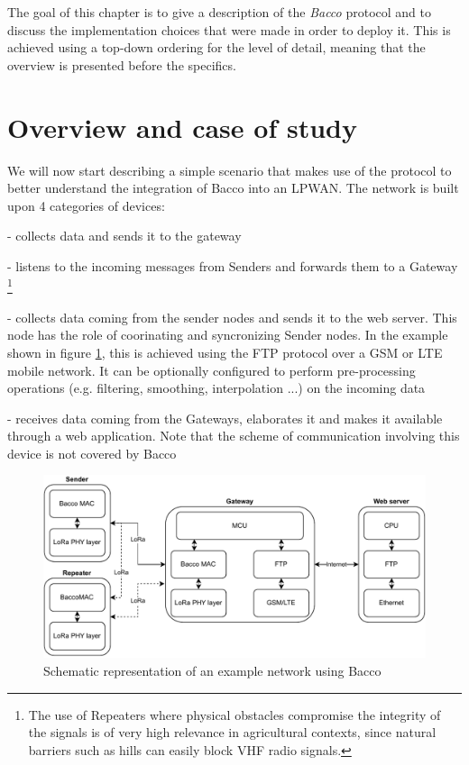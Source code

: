 The goal of this chapter is to give a description of the \textit{Bacco} protocol and to discuss the
implementation choices that were made in order to deploy it. This is achieved using a top-down ordering for the level
of detail, meaning that the overview is presented before the specifics.

\section{Overview and case of study}
We will now start describing a simple scenario that makes use of the protocol to better understand the integration of
Bacco into an LPWAN. The network is built upon 4 categories of devices:

\begin{description}[font=$\bullet$~\normalfont\scshape\color{blue!50!black}]
    \item [Sender node] - collects data and sends it to the gateway
    \item [Repeater node] - listens to the incoming messages from Senders and forwards them to a Gateway \footnote{The
        use of Repeaters where physical obstacles compromise the integrity of the signals is of very high relevance in
        agricultural contexts, since natural barriers such as hills can easily block \gls{VHF} radio signals.}
    \item [Gateway node] - collects data coming from the sender nodes and sends it to the web server. This node has
        the role of coorinating and syncronizing Sender nodes. In the example
        shown in figure \ref{img: network stack}, this is achieved using the FTP protocol over a
        \gls{GSM} or \gls{LTE} mobile network. It can be optionally configured to perform
        pre-processing operations (e.g. filtering, smoothing, interpolation ...) on the incoming data
    \item [Web server] - receives data coming from the Gateways, elaborates it and makes it available
        through a web application. Note that the scheme of communication involving this device is not covered by
        Bacco
\end{description}

\begin{figure}[h]
    \centering
    \includegraphics[width=1.0\textwidth]{uml/network_stack.pdf}
    \caption{Schematic representation of an example network using Bacco}
    \label{img: network stack}
\end{figure}

